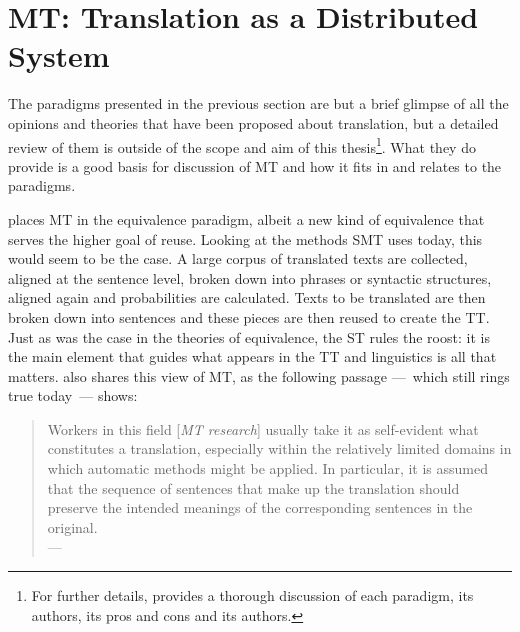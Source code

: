 \section{MT: Translation as a Distributed System}
\label{sec:mt_theory}

\noindent The paradigms presented in the previous section are but a brief glimpse of all the opinions and theories that have been proposed about translation, but a detailed review of them is outside of the scope and aim of this thesis\footnote{For further details, \textcite{pym2009exploring} provides a thorough discussion of each paradigm, its authors, its pros and cons and its authors.}. What they do provide is a good basis for discussion of \ac{MT} and how it fits in and relates to the paradigms.

\textcite{pym2009exploring} places \ac{MT} in the equivalence paradigm, albeit a new kind of equivalence that serves the higher goal of reuse. Looking at the methods \ac{SMT} uses today, this would seem to be the case. A large corpus of translated texts are collected, aligned at the sentence level, broken down into phrases or syntactic structures, aligned again and probabilities are calculated. Texts to be translated are then broken down into sentences and these pieces are then reused to create the \ac{TT}. Just as was the case in the theories of equivalence, the \ac{ST} rules the roost: it is the main element that guides what appears in the \ac{TT} and linguistics is all that matters. \textcite{kay1997still} also shares this view of \ac{MT}, as the following passage ---~which still rings true today~--- shows:

\begin{quote}
    Workers in this field [\textit{\ac{MT} research}] usually take it as self-evident what constitutes a translation, especially within the relatively limited domains in which automatic methods might be applied. In particular, it is assumed that the sequence of sentences that make up the translation should preserve the intended meanings of the corresponding sentences in the original. \\
--- \textcite{kay1997still}
\end{quote}

